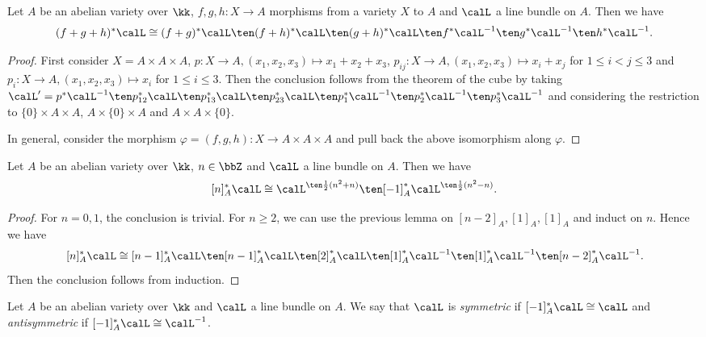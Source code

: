     \begin{lemma}\label{lem: pull back of line bundles along sum of morphisms}
        Let \(A\) be an abelian variety over \(\kk\), \(f,g,h: X \to A\) morphisms from a variety \(X\) to \(A\) and \(\calL\) a line bundle on \(A\).
        Then we have
        \[ (f+g+h)^*\calL \cong (f+g)^*\calL \ten (f+h)^*\calL \ten (g+h)^*\calL \ten f^*\calL^{-1} \ten g^*\calL^{-1} \ten h^*\calL^{-1}. \]
    \end{lemma}
    \begin{proof}
        First consider \(X = A \times A \times A\), \(p:X \to A, (x_1,x_2,x_3) \mapsto x_1+x_2+x_3\), \(p_{ij}:X \to A, (x_1,x_2,x_3) \mapsto x_i + x_j\) for \(1 \leq i < j \leq 3\) and \(p_i: X \to A, (x_1,x_2,x_3) \mapsto x_i\) for \(1 \leq i \leq 3\).
        Then the conclusion follows from the theorem of the cube by taking \(\calL' = p^*\calL^{-1} \ten p_{12}^*\calL \ten p_{13}^*\calL \ten p_{23}^*\calL \ten p_1^*\calL^{-1} \ten p_2^*\calL^{-1} \ten p_3^*\calL^{-1}\) and considering the restriction to \(\{0\} \times A \times A\), \(A \times \{0\} \times A\) and \(A \times A \times \{0\}\).

        In general, consider the morphism \(\varphi = (f,g,h): X \to A \times A \times A\) and pull back the above isomorphism along \(\varphi\).
    \end{proof}

    \begin{proposition}\label{prop: pull back of line bundles along the multiplication by n}
        Let \(A\) be an abelian variety over \(\kk\), \(n\in \bbZ\) and \(\calL\) a line bundle on \(A\). 
        Then we have 
        \[ [n]_A^*\calL \cong \calL^{\ten \frac{1}{2}(n^2+n)} \ten [-1]_A^*\calL^{\ten \frac{1}{2}(n^2-n)}. \]
    \end{proposition}
    \begin{proof}
        For \(n = 0,1\), the conclusion is trivial.
        For \(n \geq 2\), we can use the previous lemma on \([n-2]_A,[1]_A,[1]_A\) and induct on \(n\).
        Hence we have 
        \[ [n]_A^*\calL \cong [n-1]_A^*\calL \ten [n-1]_A^*\calL \ten [2]_A^*\calL \ten [1]_A^*\calL^{-1} \ten [1]_A^*\calL^{-1} \ten [n-2]_A^*\calL^{-1}. \]
        Then the conclusion follows from induction.
    \end{proof}

    \begin{definition}\label{def:symmetric_and_antisymmetric_line_bundles}
        Let \(A\) be an abelian variety over \(\kk\) and \(\calL\) a line bundle on \(A\).
        We say that \(\calL\) is \emph{symmetric} if \([-1]_A^*\calL \cong \calL\) and \emph{antisymmetric} if \([-1]_A^*\calL \cong \calL^{-1}\).
    \end{definition}

